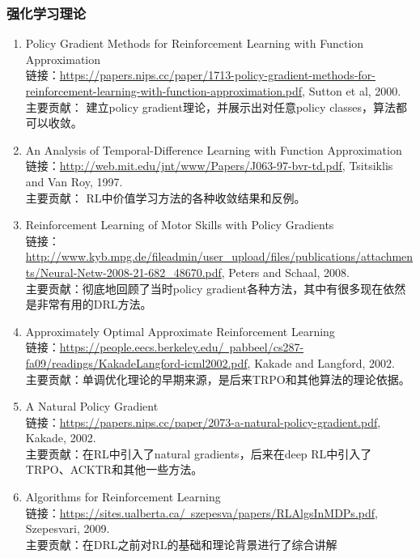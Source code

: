 \documentclass[lang=cn,11pt,a4paper]{elegant_template}
\begin{document}
\subsubsection{强化学习理论}
\begin{enumerate}
    \item Policy Gradient Methods for Reinforcement Learning with Function Approximation \\
    链接：\href{https://papers.nips.cc/paper/1713-policy-gradient-methods-for-reinforcement-learning-with-function-approximation.pdf}{https://papers.nips.cc/paper/1713-policy-gradient-methods-for-reinforcement-learning-with-function-approximation.pdf}, Sutton et al, 2000. \\
    主要贡献： 建立policy gradient理论，并展示出对任意policy classes，算法都可以收敛。
    \item An Analysis of Temporal-Difference Learning with Function Approximation \\
    链接：\href{http://web.mit.edu/jnt/www/Papers/J063-97-bvr-td.pdf}{http://web.mit.edu/jnt/www/Papers/J063-97-bvr-td.pdf}, Tsitsiklis and Van Roy, 1997. \\
    主要贡献： RL中价值学习方法的各种收敛结果和反例。
    \item Reinforcement Learning of Motor Skills with Policy Gradients \\
    链接：\href{http://www.kyb.mpg.de/fileadmin/user_upload/files/publications/attachments/Neural-Netw-2008-21-682_48670.pdf}{http://www.kyb.mpg.de/fileadmin/user\_upload/files/publications/attachments/Neural-Netw-2008-21-682\_48670.pdf}, Peters and Schaal, 2008. \\
    主要贡献：彻底地回顾了当时policy gradient各种方法，其中有很多现在依然是非常有用的DRL方法。
    \item Approximately Optimal Approximate Reinforcement Learning \\
    链接：\href{https://people.eecs.berkeley.edu/~pabbeel/cs287-fa09/readings/KakadeLangford-icml2002.pdf}{https://people.eecs.berkeley.edu/~pabbeel/cs287-fa09/readings/KakadeLangford-icml2002.pdf}, Kakade and Langford, 2002. \\
    主要贡献：单调优化理论的早期来源，是后来TRPO和其他算法的理论依据。
    \item A Natural Policy Gradient  \\
    链接：\href{https://papers.nips.cc/paper/2073-a-natural-policy-gradient.pdf}{https://papers.nips.cc/paper/2073-a-natural-policy-gradient.pdf}, Kakade, 2002. \\
    主要贡献：在RL中引入了natural gradients，后来在deep RL中引入了TRPO、ACKTR和其他一些方法。
    \item Algorithms for Reinforcement Learning  \\
    链接：\href{https://sites.ualberta.ca/~szepesva/papers/RLAlgsInMDPs.pdf}{https://sites.ualberta.ca/~szepesva/papers/RLAlgsInMDPs.pdf}, Szepesvari, 2009. \\
    主要贡献：在DRL之前对RL的基础和理论背景进行了综合讲解
\end{enumerate}
\end{document}
